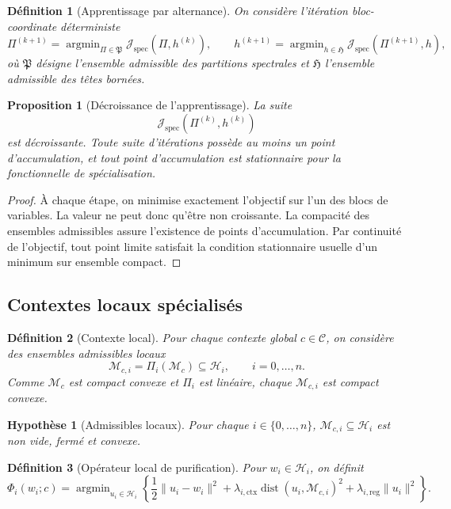 \documentclass[11pt,a4paper]{article}
\newtheorem{definition}{Définition}[section]
\newtheorem{assumption}{Hypothèse}[section]
\newtheorem{proposition}{Proposition}[section]
\DeclareMathOperator{\argmin}{argmin}
\DeclareMathOperator{\dist}{dist}
\newcommand{\C}{\mathcal C}
\newcommand{\Hh}{\mathcal H}
\newcommand{\Mcal}{\mathcal M}
\newcommand{\1}{\mathbf 1}
\begin{document}
\begin{definition}[Apprentissage par alternance]
On considère l'itération bloc-coordinate déterministe
\[
\Pi^{(k+1)}
=
\argmin_{\Pi\in\mathfrak P}\mathcal J_{\mathrm{spec}}(\Pi,h^{(k)}),
\qquad
h^{(k+1)}
=
\argmin_{h\in\mathfrak H}\mathcal J_{\mathrm{spec}}(\Pi^{(k+1)},h),
\]
où \(\mathfrak P\) désigne l'ensemble admissible des partitions spectrales et \(\mathfrak H\) l'ensemble admissible des têtes bornées.
\end{definition}

\begin{proposition}[Décroissance de l'apprentissage]
La suite
\[
\mathcal J_{\mathrm{spec}}(\Pi^{(k)},h^{(k)})
\]
est décroissante.  
Toute suite d'itérations possède au moins un point d'accumulation, et tout point d'accumulation est stationnaire pour la fonctionnelle de spécialisation.
\end{proposition}

\begin{proof}
À chaque étape, on minimise exactement l'objectif sur l'un des blocs de variables.  
La valeur ne peut donc qu'être non croissante.  
La compacité des ensembles admissibles assure l'existence de points d'accumulation.  
Par continuité de l'objectif, tout point limite satisfait la condition stationnaire usuelle d'un minimum sur ensemble compact.
\end{proof}

\subsection{Contextes locaux spécialisés}

\begin{definition}[Contexte local]
Pour chaque contexte global \(c\in\C\), on considère des ensembles admissibles locaux
\[
\Mcal_{c,i}=\Pi_i(\Mcal_c)\subseteq \Hh_i,
\qquad i=0,\dots,n.
\]
Comme \(\Mcal_c\) est compact convexe et \(\Pi_i\) est linéaire, chaque \(\Mcal_{c,i}\) est compact convexe.
\end{definition}

\begin{assumption}[Admissibles locaux]
Pour chaque \(i\in\{0,\dots,n\}\), \(\Mcal_{c,i}\subseteq \Hh_i\) est non vide, fermé et convexe.
\end{assumption}

\begin{definition}[Opérateur local de purification]
Pour \(w_i\in\Hh_i\), on définit
\[
\Phi_i(w_i;c)
=
\argmin_{u_i\in\Hh_i}
\left\{
\frac12\|u_i-w_i\|^2
+
\lambda_{i,\mathrm{ctx}}\dist(u_i,\Mcal_{c,i})^2
+
\lambda_{i,\mathrm{reg}}\|u_i\|^2
\right\}.
\]
\end{definition}
\end{document}
